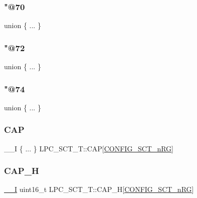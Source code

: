 \mbox{\label{struct_l_p_c___s_c_t___t_ae5e8a9af43ef4c9c5cc199902ce0a4e3}} 
\subsubsection{\texorpdfstring{"@70}{@70}}
{\footnotesize\ttfamily union \{ ... \} }

\mbox{\label{struct_l_p_c___s_c_t___t_a921773b173c110576debdfbfa46ca93d}} 
\subsubsection{\texorpdfstring{"@72}{@72}}
{\footnotesize\ttfamily union \{ ... \} }

\mbox{\label{struct_l_p_c___s_c_t___t_ae0d8a0b49340f56871f5d211c93ee806}} 
\subsubsection{\texorpdfstring{"@74}{@74}}
{\footnotesize\ttfamily union \{ ... \} }

\mbox{\label{struct_l_p_c___s_c_t___t_a13750ad1975955509b277133c1ea909b}} 
\subsubsection{\texorpdfstring{C\+AP}{CAP}}
{\footnotesize\ttfamily \+\_\+\+\_\+I \{ ... \}   L\+P\+C\+\_\+\+S\+C\+T\+\_\+\+T\+::\+C\+AP\mbox{[}\hyperlink{group___s_c_t__18_x_x__43_x_x_ga8d80e251208a01483a6b00c81ecb7493}{C\+O\+N\+F\+I\+G\+\_\+\+S\+C\+T\+\_\+n\+RG}\mbox{]}}

\mbox{\label{struct_l_p_c___s_c_t___t_a2f2ca2aa2633599a9aa8dbfdb73cb20b}} 
\subsubsection{\texorpdfstring{C\+A\+P\+\_\+H}{CAP\_H}}
{\footnotesize\ttfamily \hyperlink{core__sc300_8h_af63697ed9952cc71e1225efe205f6cd3}{\+\_\+\+\_\+I} uint16\+\_\+t L\+P\+C\+\_\+\+S\+C\+T\+\_\+\+T\+::\+C\+A\+P\+\_\+H\mbox{[}\hyperlink{group___s_c_t__18_x_x__43_x_x_ga8d80e251208a01483a6b00c81ecb7493}{C\+O\+N\+F\+I\+G\+\_\+\+S\+C\+T\+\_\+n\+RG}\mbox{]}}

